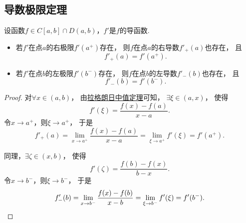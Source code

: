 \subsection{导数极限定理}
\begin{theorem}[导数极限定理]\label{theorem:微分中值定理.导数极限定理}
设函数\(f \in C[a,b] \cap D(a,b)\)，\(f'\)是\(f\)的导函数.
\begin{itemize}
	\item 若\(f'\)在点\(a\)的右极限\(f'(a^+)\)存在，
	则\(f\)在点\(a\)的右导数\(f'_+(a)\)也存在，
	且\begin{equation*}
		f'_+(a) = f'(a^+).
	\end{equation*}
	\item 若\(f'\)在点\(b\)的左极限\(f'(b^-)\)存在，
	则\(f\)在点\(b\)的左导数\(f'_-(b)\)也存在，
	且\begin{equation*}
		f'_-(b) = f'(b^-).
	\end{equation*}
\end{itemize}
\begin{proof}
对\(\forall x\in(a,b)\)，
由\hyperref[theorem:微分中值定理.拉格朗日中值定理]{拉格朗日中值定理}可知，
\(\exists\xi\in(a,x)\)，
使得\begin{equation*}
	f'(\xi) = \frac{f(x)-f(a)}{x-a}.
\end{equation*}
令\(x \to a^+\)，则\(\xi \to a^+\)，
于是\begin{equation*}
	f'_+(a)
	= \lim_{x \to a^+} \frac{f(x)-f(a)}{x-a}
	= \lim_{\xi \to a^+} f'(\xi)
	= f'(a^+).
\end{equation*}

同理，\(\exists\zeta\in(x,b)\)，
使得\begin{equation*}
	f'(\zeta) = \frac{f(b)-f(x)}{b-x}.
\end{equation*}
令\(x \to b^-\)，则\(\xi \to b^-\)，
于是\begin{equation*}
	f'_-(b)
	= \lim_{x \to b^-} \frac{f(x)-f(b)}{x-b}
	= \lim_{\xi \to b^-} f'(\xi)
	= f'(b^-).
	\qedhere
\end{equation*}
\end{proof}
\end{theorem}


